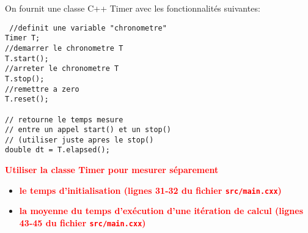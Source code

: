 \documentclass{beamer}
\begin{document}
\begin{frame}[fragile]
On fournit une classe C++ Timer
avec les fonctionnalités suivantes:

\begin{lstlisting}
 //definit une variable "chronometre"
Timer T; 
//demarrer le chronometre T
T.start();
//arreter le chronometre T
T.stop();
//remettre a zero
T.reset();

// retourne le temps mesure 
// entre un appel start() et un stop()
// (utiliser juste apres le stop()
double dt = T.elapsed(); 
\end{lstlisting}

\end{frame}

\begin{frame}
\vfill
\textcolor{red}{\bf
	Utiliser la classe Timer pour mesurer s\'eparement}
	\begin{itemize}
		\item \textcolor{red}{\bf le temps d'initialisation (lignes 31-32 du fichier {\tt src/main.cxx})}
		\item \textcolor{red}{\bf la moyenne du temps d'ex\'ecution d'une it\'eration de calcul (lignes 43-45 du fichier {\tt src/main.cxx})}
	\end{itemize}

\vfill

\end{frame}
\end{document}
